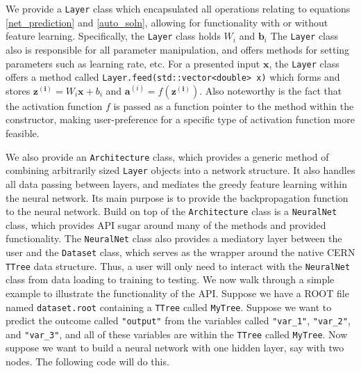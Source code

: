 We provide a \texttt{Layer} class which encapsulated all operations relating to equations \eqref{net_prediction} and \eqref{auto_soln}, allowing for functionality with or without feature learning. Specifically, the \texttt{Layer} class holds $W_i$ and $\mathbf{b}_i$ The \texttt{Layer} class also is responsible for all parameter manipulation, and offers methods for setting parameters such as learning rate, etc. For a presented input $\mathbf{x}$, the \texttt{Layer} class offers a method called \texttt{Layer.feed(std::vector<double> x)} which forms and stores $\mathbf{z^{(i)}} = W_i \mathbf{x}+{b}_i$ and $\mathbf{a}^{(i)}=f(\mathbf{z^{(i)}})$. Also noteworthy is the fact that the activation function $f$ is passed as a function pointer to the method within the constructor, making user-preference for a specific type of activation function more feasible.

We also provide an \texttt{Architecture} class, which provides a generic method of combining arbitrarily sized \texttt{Layer} objects into a network structure. It also handles all data passing between layers, and mediates the greedy feature learning within the neural network. Its main purpose is to provide the backpropagation function to the neural network. Build on top of the \texttt{Architecture} class is a \texttt{NeuralNet} class, which provides API sugar around many of the methods and provided functionality. The \texttt{NeuralNet} class also provides a mediatory layer between the user and the \texttt{Dataset} class, which serves as the wrapper around the native CERN \texttt{TTree} data structure. Thus, a user will only need to interact with the \texttt{NeuralNet} class from data loading to training to testing. We now walk through a simple example to illustrate the functionality of the API. Suppose we have a ROOT file named \texttt{dataset.root} containing a \texttt{TTree} called \texttt{MyTree}. Suppose we want to predict the outcome called \texttt{"output"} from the variables called \texttt{"var\_1"}, \texttt{"var\_2"}, and \texttt{"var\_3"}, and all of these variables are within the \texttt{TTree} called \texttt{MyTree}. Now suppose we want to build a neural network with one hidden layer, say with two nodes. The following code will do this. 

